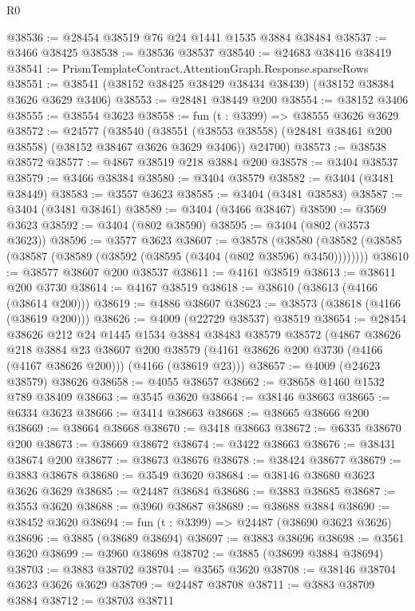 \begin{lexlean}{R0}
\begin{coremodule}
@38536 := @28454 @38519 @76 @24 @1441 @1535 @3884 @38484
@38537 := @3466 @38425
@38538 := @38536 @38537
@38540 := @24683 @38416 @38419
@38541 := PrismTemplateContract.AttentionGraph.Response.sparseRows
@38551 := @38541 (@38152 @38425 @38429 @38434 @38439) (@38152 @38384 @3626 @3629 @3406)
@38553 := @28481 @38449 @200
@38554 := @38152 @3406
@38555 := @38554 @3623
@38558 := fun (t : @3399) => @38555 @3626 @3629
@38572 := @24577
    (@38540
      (@38551 (@38553 @38558) (@28481 @38461 @200 @38558) (@38152 @38467 @3626 @3629 @3406))
      @24700)
@38573 := @38538 @38572
@38577 := @4867 @38519 @218 @3884 @200
@38578 := @3404 @38537
@38579 := @3466 @38384
@38580 := @3404 @38579
@38582 := @3404 (@3481 @38449)
@38583 := @3557 @3623
@38585 := @3404 (@3481 @38583)
@38587 := @3404 (@3481 @38461)
@38589 := @3404 (@3466 @38467)
@38590 := @3569 @3623
@38592 := @3404 (@802 @38590)
@38595 := @3404 (@802 (@3573 @3623))
@38596 := @3577 @3623
@38607 := @38578
    (@38580 (@38582 (@38585 (@38587 (@38589 (@38592 (@38595 (@3404 (@802 @38596) @3450))))))))
@38610 := @38577 @38607 @200 @38537
@38611 := @4161 @38519
@38613 := @38611 @200 @3730
@38614 := @4167 @38519
@38618 := @38610 (@38613 (@4166 (@38614 @200)))
@38619 := @4886 @38607
@38623 := @38573 (@38618 (@4166 (@38619 @200)))
@38626 := @4009 (@22729 @38537) @38519
@38654 := @28454
    @38626
    @212
    @24
    @1445
    @1534
    @3884
    @38483
    @38579
    @38572
    (@4867
      @38626
      @218
      @3884
      @23
      @38607
      @200
      @38579
      (@4161 @38626 @200 @3730 (@4166 (@4167 @38626 @200)))
      (@4166 (@38619 @23)))
@38657 := @4009 (@24623 @38579) @38626
@38658 := @4055 @38657
@38662 := @38658 @1460 @1532 @789 @38409
@38663 := @3545 @3620
@38664 := @38146 @38663
@38665 := @6334 @3623
@38666 := @3414 @38663
@38668 := @38665 @38666 @200
@38669 := @38664 @38668
@38670 := @3418 @38663
@38672 := @6335 @38670 @200
@38673 := @38669 @38672
@38674 := @3422 @38663
@38676 := @38431 @38674 @200
@38677 := @38673 @38676
@38678 := @38424 @38677
@38679 := @3883 @38678
@38680 := @3549 @3620
@38684 := @38146 @38680 @3623 @3626 @3629
@38685 := @24487 @38684
@38686 := @3883 @38685
@38687 := @3553 @3620
@38688 := @3960 @38687
@38689 := @38688 @3884
@38690 := @38452 @3620
@38694 := fun (t : @3399) => @24487 (@38690 @3623 @3626)
@38696 := @3885 (@38689 @38694)
@38697 := @3883 @38696
@38698 := @3561 @3620
@38699 := @3960 @38698
@38702 := @3885 (@38699 @3884 @38694)
@38703 := @3883 @38702
@38704 := @3565 @3620
@38708 := @38146 @38704 @3623 @3626 @3629
@38709 := @24487 @38708
@38711 := @3883 @38709 @3884
@38712 := @38703 @38711

\end{coremodule}
\end{lexlean}
